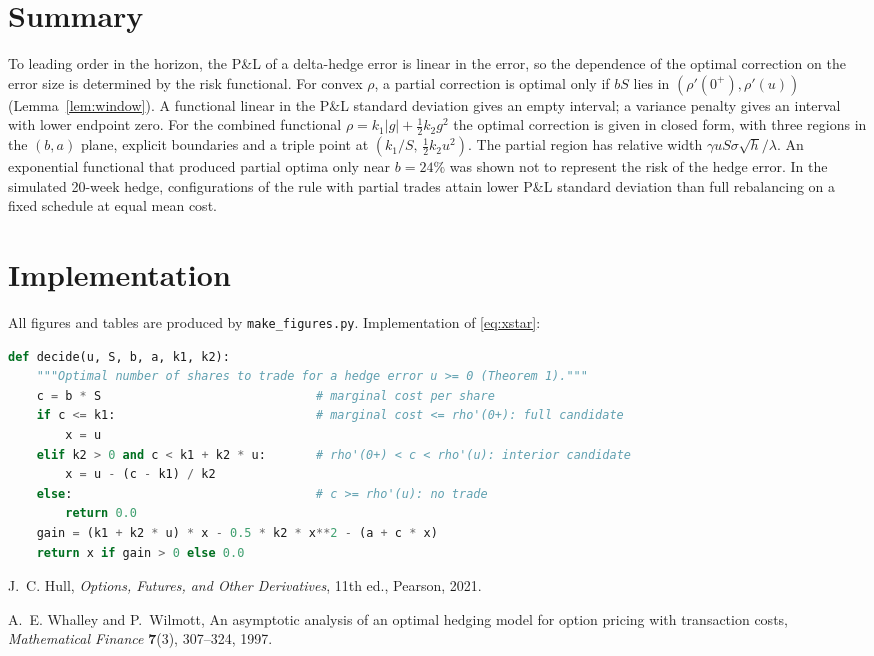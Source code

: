\documentclass[11pt,a4paper]{article}
\theoremstyle{remark}
\begin{document}
\section{Summary}

To leading order in the horizon, the P\&L of a delta-hedge error is linear in the error, so
the dependence of the optimal correction on the error size is determined by the risk
functional. For convex $\rho$, a partial correction is optimal only if $bS$ lies in
$(\rho'(0^+), \rho'(u))$ (Lemma~\ref{lem:window}). A functional linear in the P\&L standard
deviation gives an empty interval; a variance penalty gives an interval with lower endpoint
zero. For the combined functional $\rho = k_1|g| + \tfrac12k_2g^2$ the optimal correction
is given in closed form, with three regions in the $(b,a)$ plane, explicit boundaries and a
triple point at $(k_1/S,\,\tfrac12k_2u^2)$. The partial region has relative width
$\gamma uS\sigma\sqrt h/\lambda$. An exponential functional that produced partial optima
only near $b = 24\%$ was shown not to represent the risk of the hedge error. In the
simulated 20-week hedge, configurations of the rule with partial trades attain lower
P\&L standard deviation than full rebalancing on a fixed schedule at equal mean cost.

\appendix
\section{Implementation}

All figures and tables are produced by \texttt{make\_figures.py}. Implementation of
\eqref{eq:xstar}:

\begin{lstlisting}[language=Python]
def decide(u, S, b, a, k1, k2):
    """Optimal number of shares to trade for a hedge error u >= 0 (Theorem 1)."""
    c = b * S                              # marginal cost per share
    if c <= k1:                            # marginal cost <= rho'(0+): full candidate
        x = u
    elif k2 > 0 and c < k1 + k2 * u:       # rho'(0+) < c < rho'(u): interior candidate
        x = u - (c - k1) / k2
    else:                                  # c >= rho'(u): no trade
        return 0.0
    gain = (k1 + k2 * u) * x - 0.5 * k2 * x**2 - (a + c * x)
    return x if gain > 0 else 0.0
\end{lstlisting}

\begin{thebibliography}{9}
J.~C. Hull, \emph{Options, Futures, and Other Derivatives}, 11th ed., Pearson, 2021.

A.~E. Whalley and P.~Wilmott, An asymptotic analysis of an optimal hedging model for option
pricing with transaction costs, \emph{Mathematical Finance} \textbf{7}(3), 307--324, 1997.
\end{thebibliography}
\end{document}

